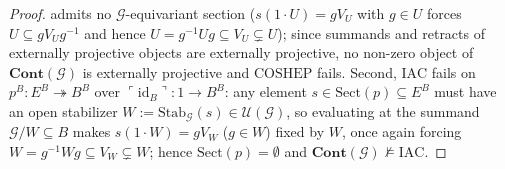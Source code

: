 \documentclass[10pt,twoside,openright]{book}
\theoremstyle{crmplain}
\theoremstyle{crmdef}
\theoremstyle{crmremark}
\begin{document}
\begin{proof}
admits no $\mathcal{G}$-equivariant section ($s(1\cdot U) = g V_U$ with $g \in U$ forces $U \subseteq g V_U g^{-1}$ and hence $U = g^{-1} U g \subseteq V_U \subsetneq U$); since summands and retracts of externally projective objects are externally projective, no non-zero object of $\mathbf{Cont}(\mathcal{G})$ is externally projective and $\mathrm{COSHEP}$ fails. Second, $\mathrm{IAC}$ fails on $p^B : E^B \twoheadrightarrow B^B$ over $\ulcorner \mathrm{id}_B \urcorner : 1 \to B^B$: any element $s \in \mathrm{Sect}(p) \subseteq E^B$ must have an open stabilizer $W := \mathrm{Stab}_{\mathcal{G}}(s) \in \mathcal{U}(\mathcal{G})$, so evaluating at the summand $\mathcal{G}/W \subseteq B$ makes $s(1 \cdot W) = g V_W$ ($g \in W$) fixed by $W$, once again forcing $W = g^{-1} W g \subseteq V_W \subsetneq W$; hence $\mathrm{Sect}(p) = \emptyset$ and $\mathbf{Cont}(\mathcal{G}) \not\models \mathrm{IAC}$.


\end{proof}
\end{document}
